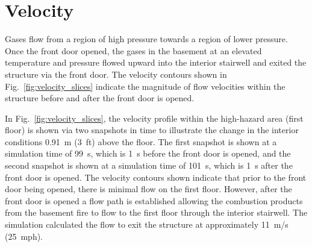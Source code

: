 \documentclass[12pt,oneside]{book}
\begin{document}
\clearpage

\section{Velocity}
\label{velocity}

Gases flow from a region of high pressure towards a region of lower pressure. Once the front door opened, the gases in the basement at an elevated temperature and pressure flowed upward into the interior stairwell and exited the structure via the front door. The velocity contours shown in Fig.~\ref{fig:velocity_slices} indicate the magnitude of flow velocities within the structure before and after the front door is opened.

In Fig.~\ref{fig:velocity_slices}, the velocity profile within the high-hazard area (first floor) is shown via two snapshots in time to illustrate the change in the interior conditions 0.91~m (3~ft) above the floor. The first snapshot is shown at a simulation time of 99~s, which is 1~s before the front door is opened, and the second snapshot is shown at a simulation time of 101~s, which is 1~s after the front door is opened. The velocity contours shown indicate that prior to the front door being opened, there is minimal flow on the first floor. However, after the front door is opened a flow path is established allowing the combustion products from the basement fire to flow to the first floor through the interior stairwell. The simulation calculated the flow to exit the structure at approximately 11~m/s (25~mph).
\end{document}
